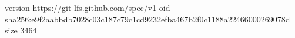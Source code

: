 version https://git-lfs.github.com/spec/v1
oid sha256:e9f2aabbdb7028c03c187c79c1cd9232efba467b2f0c1188a22466000269078d
size 3464
